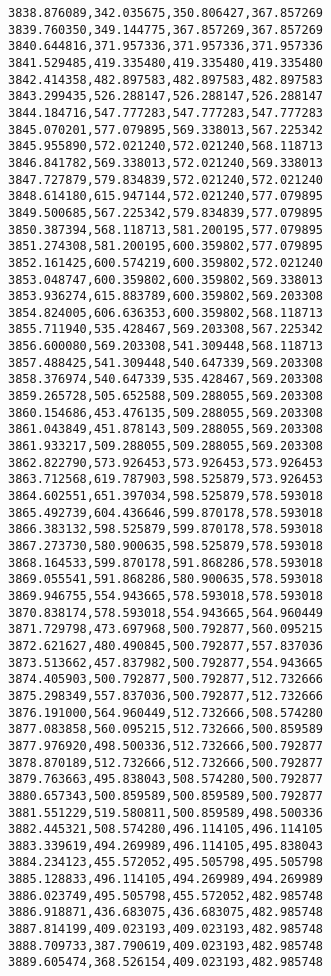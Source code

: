 \documentclass[11pt]{article}
\begin{document}
\begin{Verbatim}[commandchars=\\\{\}]
3838.876089,342.035675,350.806427,367.857269
3839.760350,349.144775,367.857269,367.857269
3840.644816,371.957336,371.957336,371.957336
3841.529485,419.335480,419.335480,419.335480
3842.414358,482.897583,482.897583,482.897583
3843.299435,526.288147,526.288147,526.288147
3844.184716,547.777283,547.777283,547.777283
3845.070201,577.079895,569.338013,567.225342
3845.955890,572.021240,572.021240,568.118713
3846.841782,569.338013,572.021240,569.338013
3847.727879,579.834839,572.021240,572.021240
3848.614180,615.947144,572.021240,577.079895
3849.500685,567.225342,579.834839,577.079895
3850.387394,568.118713,581.200195,577.079895
3851.274308,581.200195,600.359802,577.079895
3852.161425,600.574219,600.359802,572.021240
3853.048747,600.359802,600.359802,569.338013
3853.936274,615.883789,600.359802,569.203308
3854.824005,606.636353,600.359802,568.118713
3855.711940,535.428467,569.203308,567.225342
3856.600080,569.203308,541.309448,568.118713
3857.488425,541.309448,540.647339,569.203308
3858.376974,540.647339,535.428467,569.203308
3859.265728,505.652588,509.288055,569.203308
3860.154686,453.476135,509.288055,569.203308
3861.043849,451.878143,509.288055,569.203308
3861.933217,509.288055,509.288055,569.203308
3862.822790,573.926453,573.926453,573.926453
3863.712568,619.787903,598.525879,573.926453
3864.602551,651.397034,598.525879,578.593018
3865.492739,604.436646,599.870178,578.593018
3866.383132,598.525879,599.870178,578.593018
3867.273730,580.900635,598.525879,578.593018
3868.164533,599.870178,591.868286,578.593018
3869.055541,591.868286,580.900635,578.593018
3869.946755,554.943665,578.593018,578.593018
3870.838174,578.593018,554.943665,564.960449
3871.729798,473.697968,500.792877,560.095215
3872.621627,480.490845,500.792877,557.837036
3873.513662,457.837982,500.792877,554.943665
3874.405903,500.792877,500.792877,512.732666
3875.298349,557.837036,500.792877,512.732666
3876.191000,564.960449,512.732666,508.574280
3877.083858,560.095215,512.732666,500.859589
3877.976920,498.500336,512.732666,500.792877
3878.870189,512.732666,512.732666,500.792877
3879.763663,495.838043,508.574280,500.792877
3880.657343,500.859589,500.859589,500.792877
3881.551229,519.580811,500.859589,498.500336
3882.445321,508.574280,496.114105,496.114105
3883.339619,494.269989,496.114105,495.838043
3884.234123,455.572052,495.505798,495.505798
3885.128833,496.114105,494.269989,494.269989
3886.023749,495.505798,455.572052,482.985748
3886.918871,436.683075,436.683075,482.985748
3887.814199,409.023193,409.023193,482.985748
3888.709733,387.790619,409.023193,482.985748
3889.605474,368.526154,409.023193,482.985748

\end{Verbatim}
\end{document}
